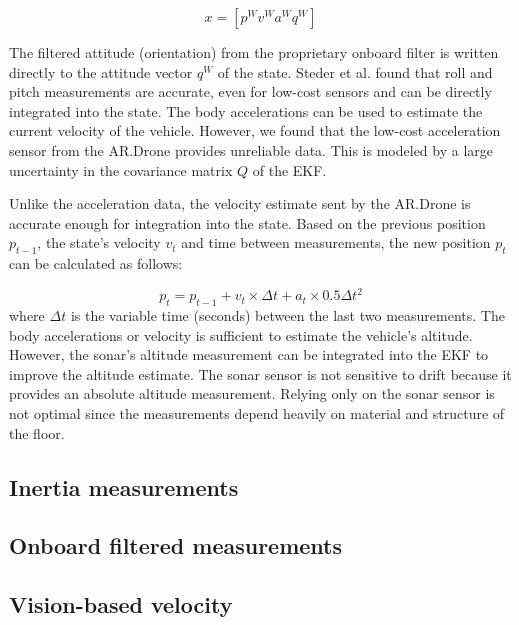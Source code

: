 \begin{equation}
x = [ p^{W}  v^{W}  a^{W}  q^{W} ]
\label{eq:EKF_state_vecor}
\end{equation}

The filtered attitude (orientation) from the proprietary onboard filter is written directly to the attitude vector $q^{W}$ of the state.
Steder et al. \cite{steder2008visual} found that roll and pitch measurements are accurate, even for low-cost sensors and can be directly integrated into the state.
The body accelerations can be used to estimate the current velocity of the vehicle.
However, we found that the low-cost acceleration sensor from the AR.Drone provides unreliable data.
This is modeled by a large uncertainty in the covariance matrix $Q$ of the EKF.

Unlike the acceleration data, the velocity estimate sent by the AR.Drone is accurate enough for integration into the state.
Based on the previous position $p_{t-1}$, the state's velocity $v_{t}$ and time between measurements, the new position $p_{t}$ can be calculated as follows:

\begin{equation}
p_{t} = p_{t-1} + v_{t} \times \Delta t + a_{t} \times 0.5 \Delta t^2
\end{equation}
where $\Delta t$ is the variable time (seconds) between the last two measurements.
The body accelerations or velocity is sufficient to estimate the vehicle's altitude.
However, the sonar's altitude measurement can be integrated into the EKF to improve the altitude estimate.
The sonar sensor is not sensitive to drift because it provides an absolute altitude measurement.
Relying only on the sonar sensor is not optimal since the measurements depend heavily on material and structure of the floor.


		\subsection{Inertia measurements}
		\subsection{Onboard filtered measurements}
		\subsection{Vision-based velocity}

